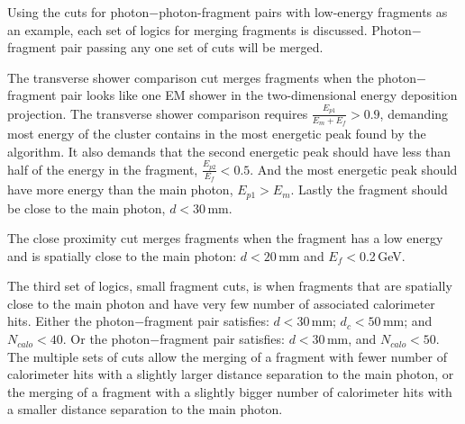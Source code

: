 Using the cuts for photon$-$photon-fragment pairs with low-energy fragments  as an example,  each set of logics for merging fragments is discussed. Photon$-$fragment pair passing any one set of cuts will be merged.


The transverse shower comparison cut merges fragments when the photon$-$fragment pair looks like one EM shower in the two-dimensional energy deposition projection. The transverse shower comparison requires $\frac{E_{p1}}{E_m + E_f} > 0.9 $, demanding  most energy of the cluster contains in the most energetic peak found by the  \peakFinding algorithm. It also demands that the second energetic peak should have less than half of the energy in the fragment,  $\frac{E_{p2}}{E_f} < 0.5 $. And the most energetic peak should have more energy than the main photon,   $E_{p1} > E_m$. Lastly the fragment should be close to the main photon, $d < 30 $\,mm.



The close proximity cut merges fragments  when the fragment has a low energy and is spatially close to the main photon: $d < 20 $\,mm and  $E_f<$0.2\,GeV.



The third set of logics, small fragment cuts,  is when fragments that are spatially close to the main photon and have very few number of associated calorimeter hits. Either the  photon$-$fragment pair satisfies:  $d < 30 $\,mm; $d_c < 50 $\,mm; and $N_{calo}<40$. Or the  photon$-$fragment pair satisfies: $d < 30 $\,mm, and $N_{calo}<50$. The multiple sets of cuts allow the merging of a fragment with fewer number of  calorimeter hits with a slightly larger distance separation to the main photon, or the merging of a fragment with a slightly bigger number of  calorimeter hits with a smaller distance separation to the main photon.

